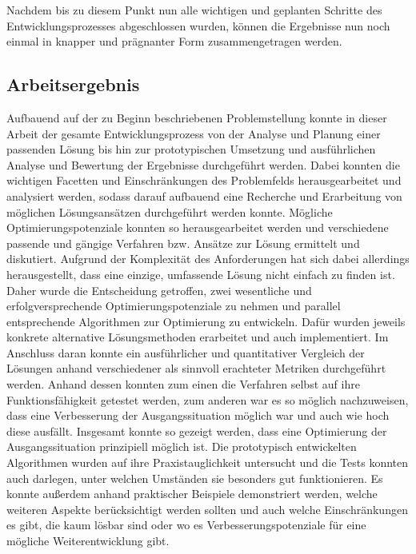 
Nachdem bis zu diesem Punkt nun alle wichtigen und geplanten Schritte des Entwicklungsprozesses abgeschlossen wurden, können die Ergebnisse nun noch einmal in knapper und prägnanter Form zusammengetragen werden. 


\subsection{Arbeitsergebnis}

Aufbauend auf der zu Beginn beschriebenen Problemstellung konnte in dieser Arbeit der gesamte Entwicklungsprozess von der Analyse und Planung einer passenden Lösung bis hin zur prototypischen Umsetzung und ausführlichen Analyse und Bewertung der Ergebnisse durchgeführt werden. Dabei konnten die wichtigen Facetten und Einschränkungen des Problemfelds herausgearbeitet und analysiert werden, sodass darauf aufbauend eine Recherche und Erarbeitung von möglichen Lösungsansätzen durchgeführt werden konnte. Mögliche Optimierungspotenziale konnten so herausgearbeitet werden und verschiedene passende und gängige Verfahren bzw. Ansätze zur Lösung ermittelt und diskutiert. Aufgrund der Komplexität des Anforderungen hat sich dabei allerdings herausgestellt, dass eine einzige, umfassende Lösung nicht einfach zu finden ist. Daher wurde die Entscheidung getroffen, zwei wesentliche und erfolgversprechende Optimierungspotenziale zu nehmen und parallel entsprechende Algorithmen zur Optimierung zu entwickeln. Dafür wurden jeweils konkrete alternative Lösungsmethoden erarbeitet und auch implementiert. Im Anschluss daran konnte ein ausführlicher und quantitativer Vergleich der Lösungen anhand verschiedener als sinnvoll erachteter Metriken durchgeführt werden. Anhand dessen konnten zum einen die Verfahren selbst auf ihre Funktionsfähigkeit getestet werden, zum anderen war es so möglich nachzuweisen, dass eine Verbesserung der Ausgangssituation möglich war und auch wie hoch diese ausfällt. Insgesamt konnte so gezeigt werden, dass eine Optimierung der Ausgangssituation prinzipiell möglich ist. Die prototypisch entwickelten Algorithmen wurden auf ihre Praxistauglichkeit untersucht und die Tests konnten auch darlegen, unter welchen Umständen sie besonders gut funktionieren. Es konnte außerdem anhand praktischer Beispiele demonstriert werden, welche weiteren Aspekte berücksichtigt werden sollten und auch welche Einschränkungen es gibt, die kaum lösbar sind oder wo es Verbesserungspotenziale für eine mögliche Weiterentwicklung gibt.

